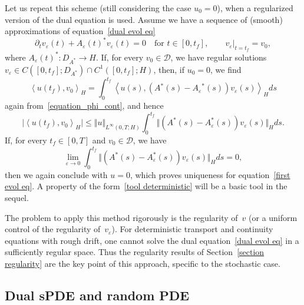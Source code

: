 \documentclass[a4paper,10pt]{article}
\newcommand\1{\mathbbm{1}}
\newcommand{\eps}{\varepsilon}
\numberwithin{equation}{section}
\begin{document}
Let us repeat this scheme (still considering the case $u_0=0$), when a regularized version of the dual equation is used. Assume we have a sequence of (smooth) approximations of equation~\eqref{dual evol eq}
\begin{equation*}
\partial_t v_{\eps} (t) +A_{\eps}(t)^{\ast} v_{\eps}(t) =0 \quad \text{for } t\in[0,t_{f}], 
\qquad v_{\eps}|_{t=t_{f}} = v_{0} ,
\end{equation*}
where $A_{\eps}(t)^{\ast} \colon D_{A^{\ast}}\rightarrow H$. If, for every $v_{0}\in\mathcal{D}$, we have regular solutions $v_{\eps} \in C([0,t_{f}];D_{A^{\ast}}) \cap C^{1}([0,t_{f}];H)$, then, if $u_0=0$, we find
\begin{equation}
\left\langle u(t_{f}),v_{0}\right\rangle _{H}=\int_{0}^{t_{f} }\left\langle u(s)  ,(  A{}^{\ast}(s) - A_{\eps}{}^{\ast}(s) )  v_{\eps}(s)
\right\rangle _{H}ds  \label{duality formula determ}
\end{equation}
again from~\eqref{equation_phi_cont}, and hence
\begin{equation*}
\vert \left\langle u(t_{f}),v_{0}\right\rangle_{H} \vert \leq \Vert u\Vert_{L^{\infty}(0,T;H)} \int_{0}^{t_{f}} \Vert ( A^{\ast}(s) - A_{\eps}^{\ast}(s)) v_{\eps}(s) \Vert_{H}ds .
\end{equation*}
If, for every $t_{f}\in [0,T]$ and $v_{0}\in\mathcal{D}$, we have
\begin{equation}
\lim_{\eps\rightarrow0}\int_{0}^{t_{f}} \Vert ( A^{\ast}(s)  -A_{\eps}^{\ast}(s))
v_{\eps} (s) \Vert_{H}ds=0 \label{tool deterministic} ,
\end{equation}
then we again conclude with $u=0$, which proves uniqueness for equation~\eqref{first evol eq}. A property of the form~\eqref{tool deterministic} will be a basic tool in the sequel.

The problem to apply this method rigorously is the regularity of~$v$ (or a uniform control of the regularity of~$v_{\eps}$). For deterministic transport and continuity equations with rough drift, one cannot solve the dual equation~\eqref{dual evol eq} in a sufficiently regular space. Thus the regularity results of Section~\ref{section regularity} are the key point of this approach, specific to the stochastic case.

\subsection{Dual sPDE and random PDE}
\end{document}
